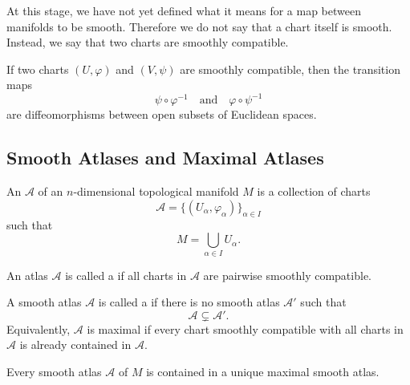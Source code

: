 \begin{remark}
At this stage, we have not yet defined what it means for a map between manifolds to be smooth.
Therefore we do not say that a chart itself is smooth. Instead, we say that two charts are smoothly compatible.
\end{remark}

\begin{remark}
If two charts $(U,\varphi)$ and $(V,\psi)$ are smoothly compatible, then the transition maps
\[
  \psi\circ \varphi^{-1}
  \quad\text{and}\quad
  \varphi\circ \psi^{-1}
\]
are diffeomorphisms between open subsets of Euclidean spaces.
\end{remark}

\subsection{Smooth Atlases and Maximal Atlases}

\begin{definition}
An  $\mathcal A$ of an $n$-dimensional topological manifold $M$ is a collection of charts
\[
  \mathcal A=\{(U_\alpha,\varphi_\alpha)\}_{\alpha\in I}
\]
such that
\[
  M=\bigcup_{\alpha\in I}U_\alpha.
\]
\end{definition}

\begin{definition}
An atlas $\mathcal A$ is called a  if all charts in $\mathcal A$ are pairwise smoothly compatible.
\end{definition}

\begin{definition}
A smooth atlas $\mathcal A$ is called a  if there is no smooth atlas $\mathcal A'$ such that
\[
  \mathcal A \subsetneq \mathcal A'.
\]
Equivalently, $\mathcal A$ is maximal if every chart smoothly compatible with all charts in $\mathcal A$ is already contained in $\mathcal A$.
\end{definition}

\begin{theorem}
Every smooth atlas $\mathcal A$ of $M$ is contained in a unique maximal smooth atlas.
\end{theorem}

